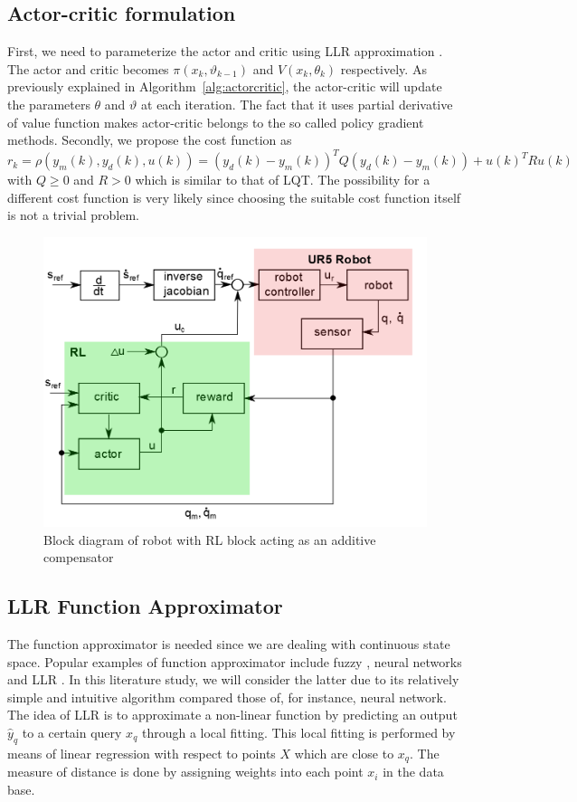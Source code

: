 \subsection{Actor-critic formulation}
First, we need to parameterize the actor and critic using \ac {LLR} approximation \cite{Grondman6096441}. The actor and critic becomes $\pi(x_k,\vartheta_{k-1})$ and $V(x_k,\theta_k)$ respectively. As previously explained in Algorithm~\ref{alg:actorcritic}, the actor-critic will update the parameters $\theta$ and $\vartheta$ at each iteration. The fact that it uses partial derivative of value function makes actor-critic belongs to the so called policy gradient methods. Secondly, we propose the cost function as
\begin{equation}
r_k = \rho(y_m(k), y_d(k), u(k)) = (y_d(k) - y_m(k))^TQ(y_d(k) - y_m(k)) + u(k)^TRu(k)
\end{equation}
with $ Q \geq 0 $ and $ R>0 $ which is similar to that of \ac {LQT}. The possibility for a different cost function is very likely since choosing the suitable cost function itself is not a trivial problem.


\begin{figure}[h]
	\centering
	\includegraphics[width=0.7\linewidth]{blockdiagram}
	\caption{Block diagram of robot with \ac{RL} block acting as an additive compensator}
	\label{fig:blockdiagram}
\end{figure}

\subsection{\ac{LLR} Function Approximator}
The function approximator is needed since we are dealing with continuous state space. Popular examples of function approximator include fuzzy \cite{Efe2014}, neural networks \cite{Kiumarsi6918527} and \ac {LLR} \cite{Grondman6096441}. In this literature study, we will consider the latter due to its relatively simple and intuitive algorithm compared those of, for instance, neural network. The idea of \ac {LLR} is to approximate a non-linear function by predicting an output $\hat{y}_q$ to a certain query $x_q$ through a local fitting. This local fitting is performed by means of linear regression with respect to points $X$ which are close to $x_q$.  
The measure of distance is done by assigning weights into each point $x_i$ in the data base. 

